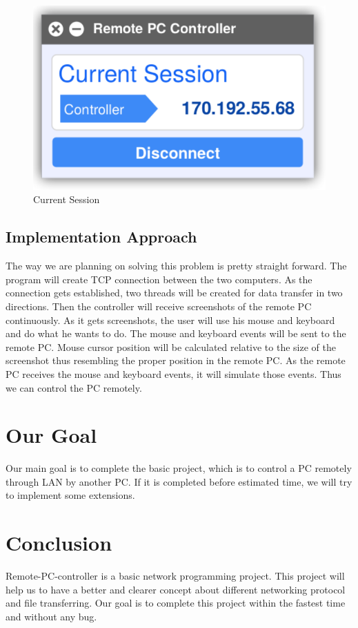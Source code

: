 \documentclass[12pt, a4paper]{article}
\begin{document}
\begin{figure}[h!]
\centering
\includegraphics[scale=0.75]{current}
\caption{Current Session}
\end{figure}

\subsection{Implementation Approach}
The way we are planning on solving this problem is pretty straight forward. The program will create TCP connection between the two computers. As the connection gets established, two threads will be created for data transfer in two directions. Then the controller will receive screenshots of the remote PC continuously. As it gets screenshots, the user will use his mouse and keyboard and do what he wants to do. The mouse and keyboard events will be sent to the remote PC. Mouse cursor position will be calculated relative to the size of the screenshot thus resembling the proper position in the remote PC. As the remote PC receives the mouse and keyboard events, it will simulate those events. Thus we can control the PC remotely.

\newpage

\section{Our Goal}
Our main goal is to complete the basic project, which is to control a PC remotely through LAN by another PC. If it is completed before estimated time, we will try to implement some extensions.


\section{Conclusion}
Remote-PC-controller is a basic network programming project. This project will help us to have a better and clearer concept about different networking protocol and file transferring. Our goal is to complete this project within the fastest time and without any bug.
\end{document}
